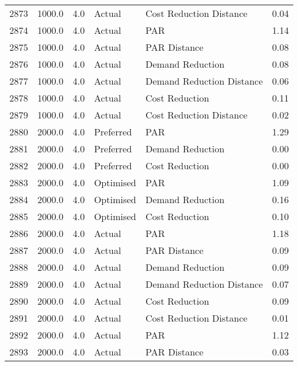 \begin{longtable}{lrrllr}
2873 &       1000.0 &     4.0 &         Actual &    Cost Reduction Distance &   0.04 \\
2874 &       1000.0 &     4.0 &         Actual &                        PAR &   1.14 \\
2875 &       1000.0 &     4.0 &         Actual &               PAR Distance &   0.08 \\
2876 &       1000.0 &     4.0 &         Actual &           Demand Reduction &   0.08 \\
2877 &       1000.0 &     4.0 &         Actual &  Demand Reduction Distance &   0.06 \\
2878 &       1000.0 &     4.0 &         Actual &             Cost Reduction &   0.11 \\
2879 &       1000.0 &     4.0 &         Actual &    Cost Reduction Distance &   0.02 \\
2880 &       2000.0 &     4.0 &      Preferred &                        PAR &   1.29 \\
2881 &       2000.0 &     4.0 &      Preferred &           Demand Reduction &   0.00 \\
2882 &       2000.0 &     4.0 &      Preferred &             Cost Reduction &   0.00 \\
2883 &       2000.0 &     4.0 &      Optimised &                        PAR &   1.09 \\
2884 &       2000.0 &     4.0 &      Optimised &           Demand Reduction &   0.16 \\
2885 &       2000.0 &     4.0 &      Optimised &             Cost Reduction &   0.10 \\
2886 &       2000.0 &     4.0 &         Actual &                        PAR &   1.18 \\
2887 &       2000.0 &     4.0 &         Actual &               PAR Distance &   0.09 \\
2888 &       2000.0 &     4.0 &         Actual &           Demand Reduction &   0.09 \\
2889 &       2000.0 &     4.0 &         Actual &  Demand Reduction Distance &   0.07 \\
2890 &       2000.0 &     4.0 &         Actual &             Cost Reduction &   0.09 \\
2891 &       2000.0 &     4.0 &         Actual &    Cost Reduction Distance &   0.01 \\
2892 &       2000.0 &     4.0 &         Actual &                        PAR &   1.12 \\
2893 &       2000.0 &     4.0 &         Actual &               PAR Distance &   0.03 \\

\end{longtable}
